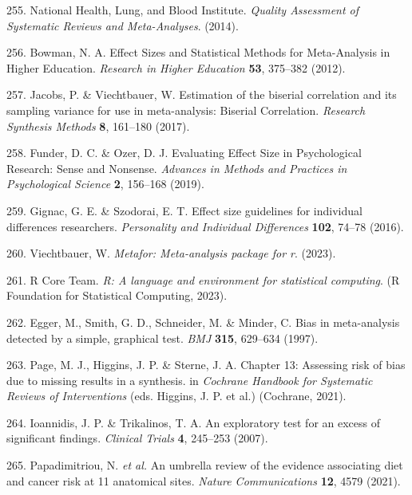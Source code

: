 \documentclass[
  english,
  man]{apa6}
\newenvironment{cslreferences}%
  {}%
  {\par}
\begin{document}
\begin{cslreferences}
\leavevmode\hypertarget{ref-NHLBIQualityAssessmentSystematic2014}{}%
255. National Health, Lung, and Blood Institute. \emph{Quality Assessment of Systematic Reviews and Meta-Analyses}. (2014).

\leavevmode\hypertarget{ref-bowmanEffectSizesStatistical2012}{}%
256. Bowman, N. A. Effect Sizes and Statistical Methods for Meta-Analysis in Higher Education. \emph{Research in Higher Education} \textbf{53}, 375--382 (2012).

\leavevmode\hypertarget{ref-jacobsEstimationBiserialCorrelation2017}{}%
257. Jacobs, P. \& Viechtbauer, W. Estimation of the biserial correlation and its sampling variance for use in meta-analysis: Biserial Correlation. \emph{Research Synthesis Methods} \textbf{8}, 161--180 (2017).

\leavevmode\hypertarget{ref-funderEvaluatingEffectSize2019}{}%
258. Funder, D. C. \& Ozer, D. J. Evaluating Effect Size in Psychological Research: Sense and Nonsense. \emph{Advances in Methods and Practices in Psychological Science} \textbf{2}, 156--168 (2019).

\leavevmode\hypertarget{ref-gignacEffectSizeGuidelines2016}{}%
259. Gignac, G. E. \& Szodorai, E. T. Effect size guidelines for individual differences researchers. \emph{Personality and Individual Differences} \textbf{102}, 74--78 (2016).

\leavevmode\hypertarget{ref-R-metafor}{}%
260. Viechtbauer, W. \emph{Metafor: Meta-analysis package for r}. (2023).

\leavevmode\hypertarget{ref-R-base}{}%
261. R Core Team. \emph{R: A language and environment for statistical computing}. (R Foundation for Statistical Computing, 2023).

\leavevmode\hypertarget{ref-eggerBiasMetaanalysisDetected1997}{}%
262. Egger, M., Smith, G. D., Schneider, M. \& Minder, C. Bias in meta-analysis detected by a simple, graphical test. \emph{BMJ} \textbf{315}, 629--634 (1997).

\leavevmode\hypertarget{ref-pageChapter13Assessing2021}{}%
263. Page, M. J., Higgins, J. P. \& Sterne, J. A. Chapter 13: Assessing risk of bias due to missing results in a synthesis. in \emph{Cochrane Handbook for Systematic Reviews of Interventions} (eds. Higgins, J. P. et al.) (Cochrane, 2021).

\leavevmode\hypertarget{ref-ioannidisExploratoryTestExcess2007}{}%
264. Ioannidis, J. P. \& Trikalinos, T. A. An exploratory test for an excess of significant findings. \emph{Clinical Trials} \textbf{4}, 245--253 (2007).

\leavevmode\hypertarget{ref-papadimitriouUmbrellaReviewEvidence2021}{}%
265. Papadimitriou, N. \emph{et al.} An umbrella review of the evidence associating diet and cancer risk at 11 anatomical sites. \emph{Nature Communications} \textbf{12}, 4579 (2021).
\end{cslreferences}

\newpage
\end{document}
